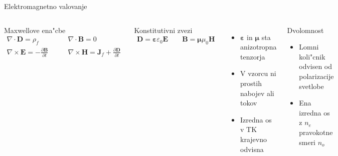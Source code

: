 \documentclass{beamer}
\newcommand{\odvod}[2]{\frac{\partial #1}{\partial #2}}
\renewcommand{\vec}{\mathbf}
\newcommand{\eps}{\varepsilon}
\begin{document}
\begin{frame}{Elektromagnetno valovanje}
\begin{columns}

 
\begin{block}{Maxwellove ena"cbe}
\begin{equation*}
\begin{aligned}
 \nabla \cdot \vec D = \rho_f & \qquad \nabla \cdot \vec B = 0 \\
 \nabla \times \vec E = -\odvod{\vec B}{t} & \qquad \nabla \times \vec H = \vec J_f + \odvod{\vec D}{t}
\end{aligned} 
\end{equation*}
\end{block}

\begin{block}{Konstitutivni zvezi}
\begin{equation*}
\begin{aligned}
\vec D = \boldsymbol\varepsilon \varepsilon_0 \vec E \qquad \vec B = \boldsymbol \mu \mu_0 \vec H
\end{aligned} 
\end{equation*}
\end{block}

\begin{itemize}
 \item $\boldsymbol\eps$ in $\boldsymbol\mu$ sta anizotropna tenzorja
 \item V vzorcu ni prostih nabojev ali tokov
 \item Izredna os v TK krajevno odvisna
\end{itemize}

\begin{block}{Dvolomnost}
\begin{itemize}
 \item Lomni koli"cnik odvisen od polarizacije svetlobe
 \item Ena izredna os z $n_e$ pravokotne smeri $n_o$
\end{itemize}
\end{block}


\end{columns}
\end{frame}
\end{document}
